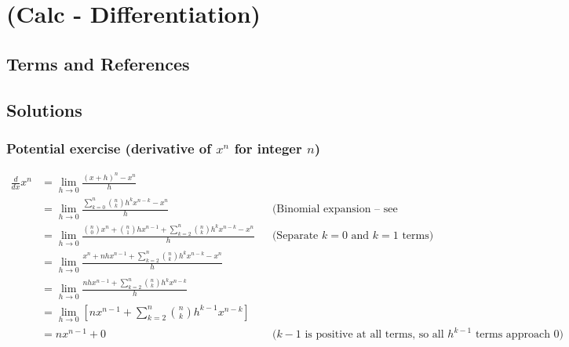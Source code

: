 \documentclass{book}
\begin{document}
\chapter{(Calc - Differentiation)}




\newpage
\section{Terms and References}

\section{Solutions}

\subsection{Potential exercise (derivative of $x^n$ for integer $n$)}

\begin{align*}
\frac{d}{dx}x^n &= \lim_{h \rightarrow 0} \frac{(x+h)^n - x^n}{h} \\
&= \lim_{h \rightarrow 0} \frac{\sum_{k=0}^n \binom{n}{k}h^k x^{n-k} - x^n}{h} && \text{(Binomial expansion -- see chapter)} \\
&= \lim_{h \rightarrow 0} \frac{\binom{n}{0}x^n + \binom{n}{1}hx^{n-1} + \sum_{k=2}^n \binom{n}{k}h^k x^{n-k} - x^n}{h} && \text{(Separate $k=0$ and $k=1$ terms)} \\
&= \lim_{h \rightarrow 0} \frac{x^n + nhx^{n-1} + \sum_{k=2}^n \binom{n}{k}h^k x^{n-k} - x^n}{h} \\
&= \lim_{h \rightarrow 0} \frac{nhx^{n-1} + \sum_{k=2}^n \binom{n}{k}h^k x^{n-k}}{h} \\
&= \lim_{h \rightarrow 0} \left[nx^{n-1} + \sum_{k=2}^n \binom{n}{k}h^{k-1} x^{n-k}\right] \\
&= nx^{n-1} + 0 && \text{($k-1$ is positive at all terms, so all $h^{k-1}$ terms approach 0)}\\
\end{align*}
\end{document}
